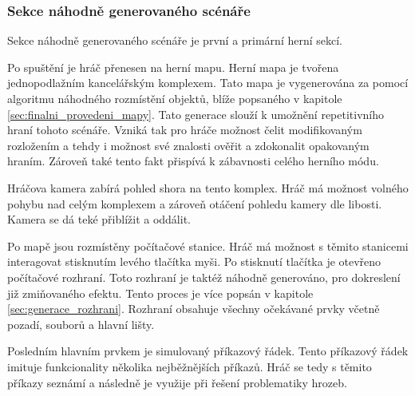 \subsubsection{Sekce náhodně generovaného scénáře}
\label{sec:nahodny_scenar}

Sekce náhodně generovaného scénáře je první a primární herní sekcí.

Po spuštění je hráč přenesen na herní mapu. Herní mapa je tvořena jednopodlažním kancelářským komplexem. Tato mapa je vygenerována za pomocí algoritmu náhodného rozmístění objektů, blíže popsaného v kapitole \ref{sec:finalni_provedeni_mapy}. Tato generace slouží k umožnění repetitivního hraní tohoto scénáře. Vzniká tak pro hráče možnost čelit modifikovaným rozložením a tehdy i možnost své znalosti ověřit a zdokonalit opakovaným hraním. Zároveň také tento fakt přispívá k zábavnosti celého herního módu.

Hráčova kamera zabírá pohled shora na tento komplex. Hráč má možnost volného pohybu nad celým komplexem a zároveň otáčení pohledu kamery dle libosti. Kamera se dá teké přiblížit a oddálit.

Po mapě jsou rozmístěny počítačové stanice. Hráč má možnost s těmito stanicemi interagovat stisknutím levého tlačítka myši. Po stisknutí tlačítka je otevřeno počítačové rozhraní. Toto rozhraní je taktéž náhodně generováno, pro dokreslení již zmiňovaného efektu. Tento proces je více popsán v kapitole \ref{sec:generace_rozhrani}. Rozhraní obsahuje všechny očekávané prvky včetně pozadí, souborů a hlavní lišty.

Posledním hlavním prvkem je simulovaný příkazový řádek. Tento příkazový řádek imituje funkcionality několika nejběžnějších příkazů. Hráč se tedy s těmito příkazy seznámí a následně je využije při řešení problematiky hrozeb.